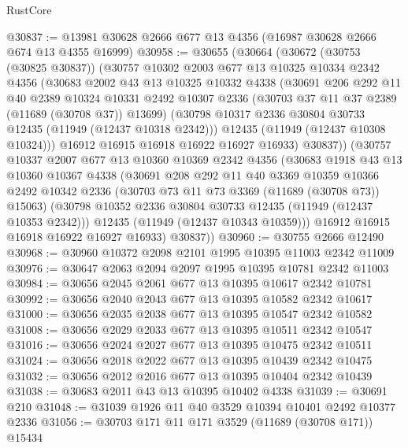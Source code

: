 \begin{lexlean}{RustCore}
\begin{coremodule}
@30837 := @13981 @30628 @2666 @677 @13 @4356 (@16987 @30628 @2666 @674 @13 @4355 @16999)
@30958 := @30655
    (@30664
      (@30672
        (@30753 (@30825 @30837))
        (@30757
          @10302
          @2003
          @677
          @13
          @10325
          @10334
          @2342
          @4356
          (@30683
            @2002
            @43
            @13
            @10325
            @10332
            @4338
            (@30691
              @206
              @292
              @11
              @40
              @2389
              @10324
              @10331
              @2492
              @10307
              @2336
              (@30703 @37 @11 @37 @2389 (@11689 (@30708 @37)) @13699)
              (@30798 @10317 @2336 @30804 @30733 @12435 (@11949 (@12437 @10318 @2342)))
              @12435
              (@11949 (@12437 @10308 @10324)))
            @16912
            @16915
            @16918
            @16922
            @16927
            @16933)
          @30837))
      (@30757
        @10337
        @2007
        @677
        @13
        @10360
        @10369
        @2342
        @4356
        (@30683
          @1918
          @43
          @13
          @10360
          @10367
          @4338
          (@30691
            @208
            @292
            @11
            @40
            @3369
            @10359
            @10366
            @2492
            @10342
            @2336
            (@30703 @73 @11 @73 @3369 (@11689 (@30708 @73)) @15063)
            (@30798 @10352 @2336 @30804 @30733 @12435 (@11949 (@12437 @10353 @2342)))
            @12435
            (@11949 (@12437 @10343 @10359)))
          @16912
          @16915
          @16918
          @16922
          @16927
          @16933)
        @30837))
@30960 := @30755 @2666 @12490
@30968 := @30960 @10372 @2098 @2101 @1995 @10395 @11003 @2342 @11009
@30976 := @30647 @2063 @2094 @2097 @1995 @10395 @10781 @2342 @11003
@30984 := @30656 @2045 @2061 @677 @13 @10395 @10617 @2342 @10781
@30992 := @30656 @2040 @2043 @677 @13 @10395 @10582 @2342 @10617
@31000 := @30656 @2035 @2038 @677 @13 @10395 @10547 @2342 @10582
@31008 := @30656 @2029 @2033 @677 @13 @10395 @10511 @2342 @10547
@31016 := @30656 @2024 @2027 @677 @13 @10395 @10475 @2342 @10511
@31024 := @30656 @2018 @2022 @677 @13 @10395 @10439 @2342 @10475
@31032 := @30656 @2012 @2016 @677 @13 @10395 @10404 @2342 @10439
@31038 := @30683 @2011 @43 @13 @10395 @10402 @4338
@31039 := @30691 @210
@31048 := @31039 @1926 @11 @40 @3529 @10394 @10401 @2492 @10377 @2336
@31056 := @30703 @171 @11 @171 @3529 (@11689 (@30708 @171)) @15434

\end{coremodule}
\end{lexlean}
